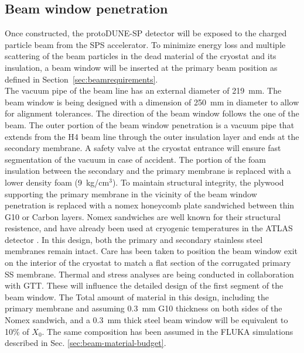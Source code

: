 \subsection{Beam window penetration}
\label{subsec:beamwindow}
Once constructed, the protoDUNE-SP detector will be exposed to the charged
particle beam from the SPS accelerator. To minimize energy loss and
multiple scattering of the beam particles in the dead material of the
cryostat and its insulation, a beam window will be inserted at the primary beam position as defined  in Section~\ref{sec:beamrequirements}. \\
  The vacuum pipe of the beam line has an external diameter of 219~mm. The beam window is being designed with a dimension of 250~mm in diameter to allow for alignment tolerances.  The direction of the beam window follows the one of the beam.
The outer portion of the
beam window penetration is a vacuum pipe that extends from the H4 beam
line through the outer insulation layer and ends at the secondary
membrane. A safety valve at the cryostat entrance will ensure fast segmentation of the vacuum in case of accident.   The
portion of the foam insulation between the secondary and the primary
membrane is replaced with a lower density foam (9~kg/cm$^3$).
To maintain structural integrity, the plywood supporting
the primary membrane in the vicinity of the beam window penetration is
replaced with a nomex honeycomb plate  sandwiched between thin G10 or Carbon layers. Nomex sandwiches are well known for their structural resistence, and have already been used at cryogenic temperatures in  the ATLAS detector .
 In this design, both the
primary and secondary stainless steel membranes remain intact. Care has been taken to position the beam window exit on the interior of the cryostat to match a flat section of the corrugated primary SS membrane.
Thermal and stress analyses are being conducted in collaboration with GTT. These will influence the detailed design of the first segment of the beam window. 
The Total amount of material in this design, including the primary membrane and assuming 0.3~mm G10 thickness on both sides of the Nomex sandwich, and a 0.3~mm thick steel beam window will be equivalent to 10\% of $X_0$. The same composition has been assumed in the FLUKA simulations described in Sec. \ref{sec:beam-material-budget}. 

